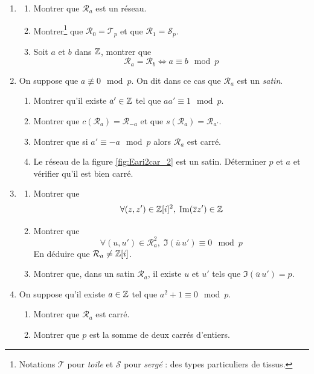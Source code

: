 \begin{enumerate}
  \item 
\begin{enumerate}
  \item Montrer que $\mathcal{R}_a$ est un réseau.
  \item Montrer\footnote{Notations $\mathcal{T}$ pour \emph{toile} et $\mathcal{S}$ pour \emph{sergé} : des types particuliers de tissus.} que $\mathcal{R}_0 = \mathcal{T}_p$ et que $\mathcal{R}_1 = \mathcal{S}_p$.
  \item Soit $a$ et $b$ dans $\mathbb{Z}$, montrer que
\begin{displaymath}
  \mathcal{R}_a = \mathcal{R}_b \Leftrightarrow a \equiv b \mod p  
\end{displaymath}
\end{enumerate}

\item On suppose que $a\not \equiv 0 \mod p$. On dit dans ce cas que $\mathcal{R}_a$ est un \emph{satin}.
\begin{enumerate}
  \item Montrer qu'il existe $a'\in \mathbb{Z}$ tel que $aa' \equiv 1 \mod p$.
  \item Montrer que $c(\mathcal{R}_a) = \mathcal{R}_{-a}$ et que $s(\mathcal{R}_a) = \mathcal{R}_{a'}$.
  \item Montrer que si $a'\equiv -a \mod p$ alors $\mathcal{R}_a$ est carré.
  \item Le réseau de la figure \ref{fig:Eari2car_2} est un satin. Déterminer $p$ et $a$ et vérifier qu'il est bien carré.
\end{enumerate}
\item
\begin{enumerate}
  \item Montrer que 
\begin{displaymath}
\forall (z,z')\in \mathbb{Z}[i]^2,\;
\operatorname{Im}(\overline{z}z') \in \mathbb{Z}
\end{displaymath}

  \item Montrer que
\begin{displaymath}
  \forall (u,u')\in \mathcal{R}_a^2,\; \Im(\overline{u}\,u') \equiv 0 \mod p
\end{displaymath}
En déduire que $\mathcal{R}_a \neq \mathbb{Z}[i]$.
  \item Montrer que, dans un satin $\mathcal{R}_a$, il existe $u$ et $u'$ tels que $\Im(\overline{u}\,u') =p$.  
\end{enumerate}


\item On suppose qu'il existe $a\in \mathbb{Z}$ tel que $a^2 + 1 \equiv 0 \mod p$.
\begin{enumerate}
  \item Montrer que $\mathcal{R}_a$ est carré.
  \item Montrer que $p$ est la somme de deux carrés d'entiers. 
\end{enumerate}

\end{enumerate}

